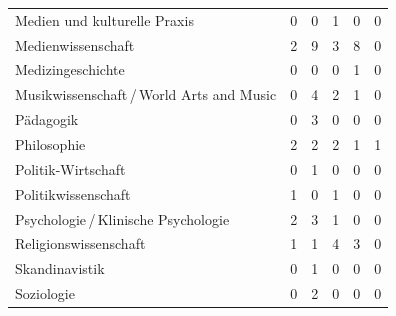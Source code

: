 \documentclass{scrartcl}
\begin{document}
\begin{landscape}
\begin{longtable}{L{7.5cm}ccccc}
      Medien und kulturelle Praxis                            & 0                     &  0                       &  1                       & 0                    & 0                       \\
      Medienwissenschaft                                      & 2                     &  9                       &  3                       & 8                    & 0                       \\
      Medizingeschichte                                       & 0                     &  0                       &  0                       & 1                    & 0                       \\
      Musikwissenschaft\,/\,World Arts and Music              & 0                     &  4                       &  2                       & 1                    & 0                       \\
      Pädagogik                                               & 0                     &  3                       &  0                       & 0                    & 0                       \\
      Philosophie                                             & 2                     &  2                       &  2                       & 1                    & 1                       \\
      Politik-Wirtschaft                                      & 0                     &  1                       &  0                       & 0                    & 0                       \\
      Politikwissenschaft                                     & 1                     &  0                       &  1                       & 0                    & 0                       \\
      Psychologie\,/\,Klinische Psychologie                   & 2                     &  3                       &  1                       & 0                    & 0                       \\
      Religionswissenschaft                                   & 1                     &  1                       &  4                       & 3                    & 0                       \\
      Skandinavistik                                          & 0                     &  1                       &  0                       & 0                    & 0                       \\
      Soziologie                                              & 0                     &  2                       &  0                       & 0                    & 0                       \\

\end{longtable}
\end{landscape}
\end{document}
